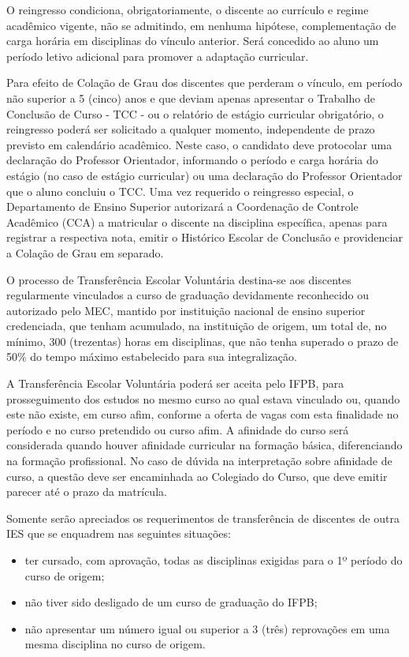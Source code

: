 	O reingresso condiciona, obrigatoriamente, o discente ao currículo e regime acadêmico vigente, não se admitindo, em nenhuma hipótese, complementação de carga horária em disciplinas do vínculo anterior. Será concedido ao aluno um período letivo adicional para promover a adaptação curricular.

	Para efeito de Colação de Grau dos discentes que perderam o vínculo, em período não superior a 5 (cinco) anos e que deviam apenas apresentar o Trabalho de Conclusão de Curso - TCC - ou o relatório de estágio curricular obrigatório, o reingresso poderá ser solicitado a qualquer momento, independente de prazo previsto em calendário acadêmico. Neste caso, o candidato deve protocolar uma declaração do Professor Orientador, informando o período e carga horária do estágio (no caso de estágio curricular) ou uma declaração do Professor Orientador que o aluno concluiu o TCC. Uma vez requerido o reingresso especial, o Departamento de Ensino Superior autorizará a Coordenação de Controle Acadêmico (CCA) a matricular o discente na disciplina específica, apenas para registrar a respectiva nota, emitir o Histórico Escolar de Conclusão e providenciar a Colação de Grau em separado.

	O processo de Transferência Escolar Voluntária destina-se aos discentes regularmente vinculados a curso de graduação devidamente reconhecido ou autorizado pelo MEC, mantido por instituição nacional de ensino superior credenciada, que tenham acumulado, na instituição de origem, um total de, no mínimo, 300 (trezentas) horas em disciplinas, que não tenha superado o prazo de 50\% do tempo máximo estabelecido para sua integralização. 
	
	A Transferência Escolar Voluntária poderá ser aceita pelo IFPB, para prosseguimento dos estudos no mesmo curso ao qual estava vinculado ou, quando este não existe, em curso afim, conforme a oferta de vagas com esta finalidade no período e no curso pretendido ou curso afim. A afinidade do curso será considerada quando houver afinidade curricular na formação básica, diferenciando na formação profissional. No caso de dúvida na interpretação sobre afinidade de curso, a questão deve ser encaminhada ao Colegiado do Curso, que deve emitir parecer até o prazo da matrícula.

	Somente serão apreciados os requerimentos de transferência de discentes de outra IES que se enquadrem nas seguintes situações:

	\begin{itemize}
		\item ter cursado, com aprovação, todas as disciplinas exigidas para o 1º período do curso de origem;
		\item não tiver sido desligado de um curso de graduação do IFPB;
		\item não apresentar um número igual ou superior a 3 (três) reprovações em uma mesma disciplina no curso de origem.
	\end{itemize}
	
